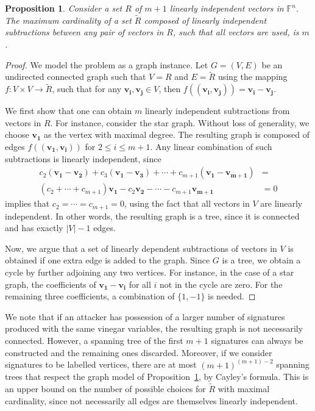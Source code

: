 \documentclass[12pt, a4paper, oneside]{memoir}
\newtheorem{proposition}[theorem]{Proposition}
\theoremstyle{definition}
\begin{document}
\begin{proposition}\label{prop:graph}
  Consider a set $R$ of $m + 1$ linearly independent vectors in $\mathbb{F}^{n}$. The maximum cardinality of a set $\widetilde{R}$ composed of linearly independent subtractions between any pair of vectors in $R$, such that all vectors are used, is $m$.
\end{proposition}
\begin{proof}
  We model the problem as a graph instance. Let $G = (V, E)$ be an undirected connected graph such that $V = R$ and $E = \widetilde{R}$ using the mapping $f : V \times V \to \widetilde{R}$, such that for any $\mathbf{v_{i}}, \mathbf{v_{j}} \in V$, then $f((\mathbf{v_{i}}, \mathbf{v_{j}})) = \mathbf{v_{i}} - \mathbf{v_{j}}$. 
  
  We first show that one can obtain $m$ linearly independent subtractions from vectors in $R$. For instance, consider the star graph. Without loss of generality, we choose $\mathbf{v_{1}}$ as the vertex with maximal degree. The resulting graph is composed of edges $f((\mathbf{v_{1}}, \mathbf{v_{i}}))$ for $2 \leq i \leq m + 1$. Any linear combination of such subtractions is linearly independent, since
  \begin{align*}
    c_{2} (\mathbf{v_{1}} - \mathbf{v_{2}}) + c_{3} (\mathbf{v_{1}} - \mathbf{v_{3}}) + \cdots + c_{m + 1} (\mathbf{v_{1}} - \mathbf{v_{m + 1}}) &= \\
    (c_{2} + \cdots + c_{m + 1}) \mathbf{v_{1}} - c_{2} \mathbf{v_{2}} - \cdots - c_{m + 1} \mathbf{v_{m + 1}} &= 0
  \end{align*}
  implies that $c_{2} = \cdots = c_{m + 1} = 0$, using the fact that all vectors in $V$ are linearly independent. In other words, the resulting graph is a tree, since it is connected and has exactly $|V| - 1$ edges.
  
  Now, we argue that a set of linearly dependent subtractions of vectors in $V$ is obtained if one extra edge is added to the graph. Since $G$ is a tree, we obtain a cycle by further adjoining any two vertices. For instance, in the case of a star graph, the coefficients of $\mathbf{v_{1}} - \mathbf{v_{i}}$ for all $i$ not in the cycle are zero. For the remaining three coefficients, a combination of $\{1, -1\}$ is needed.
\end{proof}

We note that if an attacker has possession of a larger number of signatures produced with the same vinegar variables, the resulting graph is not necessarily connected. However, a spanning tree of the first $m + 1$ signatures can always be constructed and the remaining ones discarded. Moreover, if we consider signatures to be labelled vertices, there are at most $(m + 1)^{(m + 1) - 2}$ spanning trees that respect the graph model of Proposition~\ref{prop:graph}, by Cayley's formula. This is an upper bound on the number of possible choices for $\widetilde{R}$ with maximal cardinality, since not necessarily all edges are themselves linearly independent.
\end{document}
